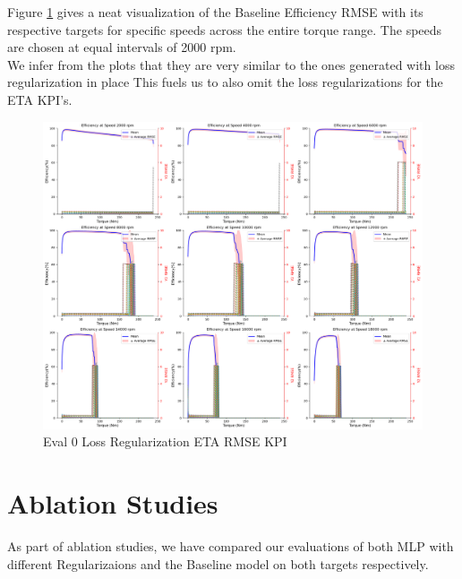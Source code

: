 \documentclass{report} %
\begin{document}
Figure \ref{fig:Eval 0 Loss Regularization ETA RMSE KPI} gives a neat visualization of the Baseline Efficiency \ac{RMSE} with its respective targets for specific speeds across the entire torque range.
The speeds are chosen at equal intervals of 2000 rpm.\\
We infer from the plots that they are very similar to the ones generated with loss regularization in place
This fuels us to also omit the loss regularizations for the ETA \ac{KPI}'s.\\
\begin{figure}[H]
    \centering
    \includegraphics[width=1\textwidth]{./ReportImages/rmse_eta_no_lossreg_MLP.png} 
    \caption{Eval 0 Loss Regularization ETA \ac{RMSE} \ac{KPI}} 
    \label{fig:Eval 0 Loss Regularization ETA RMSE KPI}
\end{figure}

\section{Ablation Studies}\label{sec:Ablation Studies}

As part of ablation studies, we have compared our evaluations of both  \ac{MLP} with different Regularizaions and the Baseline model on both targets respectively.
\end{document}
